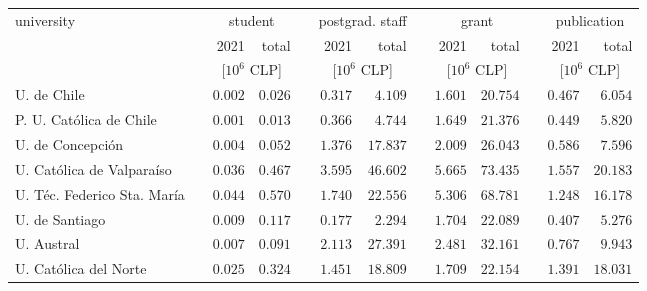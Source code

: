 \begin{tabular}{l crr crr crr crr}
\hline\hline
university                     & 
&                                      \multicolumn{2}{c}{student} & 
&                              \multicolumn{2}{c}{postgrad. staff} & 
&                                                                          \multicolumn{2}{c}{grant} & 
&                                                                                                      \multicolumn{2}{c}{publication} \\
                               & &          2021 & total           & &          2021 & total           & &          2021 & total           & &          2021 & total           \\
                               & & \multicolumn{2}{c}{[$10^6$ CLP]} & & \multicolumn{2}{c}{[$10^6$ CLP]} & & \multicolumn{2}{c}{[$10^6$ CLP]} & & \multicolumn{2}{c}{[$10^6$ CLP]} \\
\hline
U. de Chile                    & & $      0.002$ & $        0.026$ & & $      0.317$ & $        4.109$ & & $      1.601$ & $       20.754$ & & $      0.467$ & $        6.054$ \\
P. U. Católica de Chile        & & $      0.001$ & $        0.013$ & & $      0.366$ & $        4.744$ & & $      1.649$ & $       21.376$ & & $      0.449$ & $        5.820$ \\
U. de Concepción               & & $      0.004$ & $        0.052$ & & $      1.376$ & $       17.837$ & & $      2.009$ & $       26.043$ & & $      0.586$ & $        7.596$ \\
U. Católica de Valparaíso      & & $      0.036$ & $        0.467$ & & $      3.595$ & $       46.602$ & & $      5.665$ & $       73.435$ & & $      1.557$ & $       20.183$ \\
U. Téc. Federico Sta. María    & & $      0.044$ & $        0.570$ & & $      1.740$ & $       22.556$ & & $      5.306$ & $       68.781$ & & $      1.248$ & $       16.178$ \\
U. de Santiago                 & & $      0.009$ & $        0.117$ & & $      0.177$ & $        2.294$ & & $      1.704$ & $       22.089$ & & $      0.407$ & $        5.276$ \\
U. Austral                     & & $      0.007$ & $        0.091$ & & $      2.113$ & $       27.391$ & & $      2.481$ & $       32.161$ & & $      0.767$ & $        9.943$ \\
U. Católica del Norte          & & $      0.025$ & $        0.324$ & & $      1.451$ & $       18.809$ & & $      1.709$ & $       22.154$ & & $      1.391$ & $       18.031$ \\

\end{tabular}
